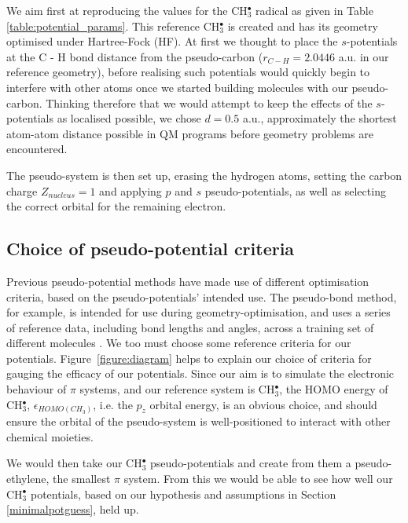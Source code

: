 \documentclass[12pt]{article}
\begin{document}
We aim first at reproducing the values for the CH\(^{\bullet}_{3}\) radical as given in Table \ref{table:potential_params}. 
This reference CH\(^{\bullet}_{3}\) is created and has its geometry optimised under Hartree-Fock (HF). At first we thought to place the $s$-potentials at the C - H bond distance from the pseudo-carbon ($r_{C - H} = 2.0446$ a.u. in our reference geometry), before realising such potentials would quickly begin to interfere with other atoms once we started building molecules with our pseudo-carbon. Thinking therefore that we would attempt to keep the effects of the $s$-potentials as localised possible, we chose $d=0.5$ a.u., approximately the shortest atom-atom distance possible in QM programs before geometry problems are encountered.

The pseudo-system is then set up, erasing the hydrogen atoms, setting the carbon charge \(Z_{nucleus} = 1\) and applying $p$ and $s$ pseudo-potentials,
as well as selecting the correct orbital for the remaining electron.

\subsection*{\sffamily \large Choice of pseudo-potential criteria} \label{stepbystep}

Previous pseudo-potential methods have made use of different optimisation criteria, based on the pseudo-potentials' intended use. The pseudo-bond method, for example, is intended for use during geometry-optimisation, and uses a series of reference data, including bond lengths and angles, across a training set of different molecules \cite{zhang_pseudobond_1998}. We too must choose some reference criteria for our potentials. Figure~\ref{figure:diagram} helps to explain our choice of criteria for gauging the efficacy of our potentials. Since our aim is to simulate the electronic behaviour of $\pi$ systems, and our reference system is CH$_3^\bullet$, the HOMO energy of CH$_3^{\bullet}$, $\epsilon_{HOMO(CH_3)}$, i.e. the $p_{z}$ orbital energy, is an obvious choice, and should ensure the orbital of the pseudo-system is well-positioned to interact with other chemical moieties.

We would then take our CH$_3^{\bullet}$ pseudo-potentials and create from them a pseudo-ethylene, the smallest $\pi$ system. From this we would be able to see how well our CH$_3^\bullet$ potentials, based on our hypothesis and assumptions in Section \ref{minimalpotguess}, held up. 
\end{document}
